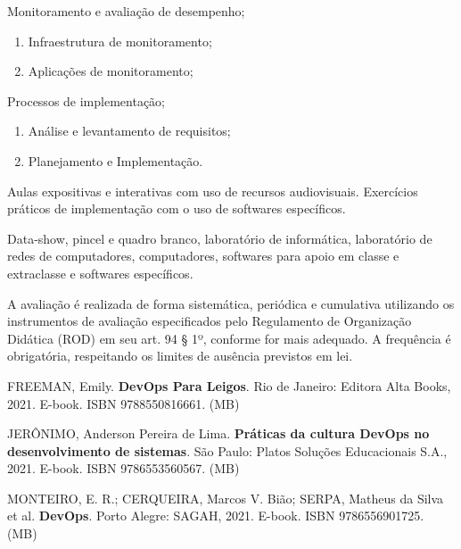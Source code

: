 \begin{pud}
\begin{description}[itemsep=0em]
		\item[UNIDADE IV:] Monitoramento e avaliação de desempenho; 
        \begin{enumerate}[itemsep=0em, topsep=0em]
			\item Infraestrutura de monitoramento;
			\item Aplicações de monitoramento;
			
		\end{enumerate}
		
		\item[UNIDADE V:] Processos de implementação; 
        \begin{enumerate}[itemsep=0em, topsep=0em]
			\item Análise e levantamento de requisitos;
			\item Planejamento e Implementação.
			
		\end{enumerate}
	\end{description}
	
	\metodologia
	Aulas expositivas e interativas com uso de recursos audiovisuais. Exercícios
práticos de implementação com o uso de softwares específicos.

	\recursos
	Data-show, pincel e quadro branco, laboratório de informática, laboratório de redes
de computadores, computadores, softwares para apoio em classe e extraclasse e
softwares específicos.

	\avaliacao
	A avaliação é realizada de forma sistemática, periódica e cumulativa utilizando os
instrumentos de avaliação especificados pelo Regulamento de Organização
Didática (ROD) em seu art. 94 § 1º, conforme for mais adequado. A frequência é
obrigatória, respeitando os limites de ausência previstos em lei.
	\naopresencial
	
	\begin{bibbasica}
		\item FREEMAN, Emily. \textbf{DevOps Para Leigos}. Rio de Janeiro: Editora Alta Books,
2021. E-book. ISBN 9788550816661. (MB)
		\item JERÔNIMO, Anderson Pereira de Lima. \textbf{Práticas da cultura DevOps no
desenvolvimento de sistemas}. São Paulo: Platos Soluções Educacionais S.A.,
2021. E-book. ISBN 9786553560567. (MB)
		\item MONTEIRO, E. R.; CERQUEIRA, Marcos V. Bião; SERPA, Matheus da Silva et al.
\textbf{DevOps}. Porto Alegre: SAGAH, 2021. E-book. ISBN 9786556901725. (MB)
	\end{bibbasica}
	

\end{pud}
